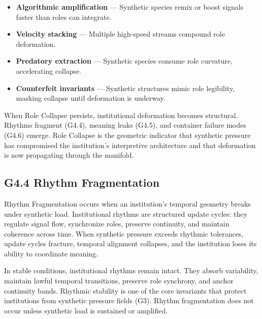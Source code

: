 \begin{itemize}[leftmargin=1.2cm]
    \item \textbf{Algorithmic amplification} — Synthetic species remix or boost
    signals faster than roles can integrate.

    \item \textbf{Velocity stacking} — Multiple high-speed streams compound role
    deformation.

    \item \textbf{Predatory extraction} — Synthetic species consume role
    curvature, accelerating collapse.

    \item \textbf{Counterfeit invariants} — Synthetic structures mimic role
    legibility, masking collapse until deformation is underway.
\end{itemize}

\medskip

\noindent When Role Collapse persists, institutional deformation becomes
structural. Rhythms fragment (G4.4), meaning leaks (G4.5), and container failure
modes (G4.6) emerge. Role Collapse is the geometric indicator that synthetic
pressure has compromised the institution’s interpretive architecture and that
deformation is now propagating through the manifold.

\subsection*{G4.4 Rhythm Fragmentation}

\noindent Rhythm Fragmentation occurs when an institution’s temporal geometry
breaks under synthetic load. Institutional rhythms are structured update cycles:
they regulate signal flow, synchronize roles, preserve continuity, and maintain
coherence across time. When synthetic pressure exceeds rhythmic tolerances,
update cycles fracture, temporal alignment collapses, and the institution loses
its ability to coordinate meaning.

\medskip

\noindent In stable conditions, institutional rhythms remain intact. They absorb
variability, maintain lawful temporal transitions, preserve role synchrony, and
anchor continuity bands. Rhythmic stability is one of the core invariants that
protect institutions from synthetic pressure fields (G3). Rhythm fragmentation
does not occur unless synthetic load is sustained or amplified.

\medskip

